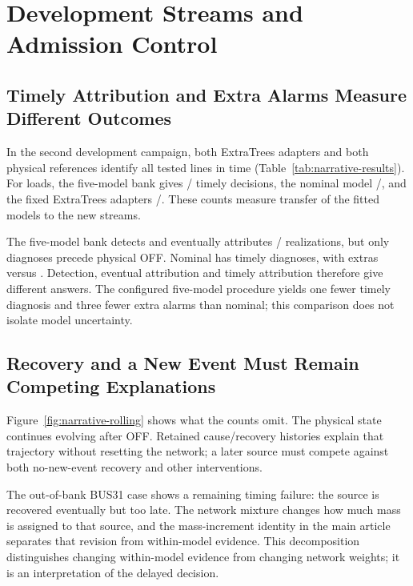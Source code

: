 \section{Development Streams and Admission Control}
\label{app:development-streams}

\subsection{Timely Attribution and Extra Alarms Measure Different Outcomes}



In the second development campaign, both ExtraTrees adapters and both physical references identify all tested lines in time (Table~\ref{tab:narrative-results}). For loads, the five-model bank gives \NarMixLoadTimely{}/\NarMixLoadTotal{} timely decisions, the nominal model \NarNomLoadTimely{}/\NarNomLoadTotal{}, and the fixed ExtraTrees adapters \NarETLoadTimely{}/\NarETLoadTotal{}. These counts measure transfer of the fitted models to the new streams.

The five-model bank detects and eventually attributes \NarMixJoint{}/\NarMixEvents{} realizations, but only \ContMixTimely{} diagnoses precede physical OFF. Nominal has \ContNomTimely{} timely diagnoses, with \ContNomExtras{} extras versus \ContMixExtras{}. Detection, eventual attribution and timely attribution therefore give different answers. The configured five-model procedure yields one fewer timely diagnosis and three fewer extra alarms than nominal; this comparison does not isolate model uncertainty.

\subsection{Recovery and a New Event Must Remain Competing Explanations}

Figure~\ref{fig:narrative-rolling} shows what the counts omit. The physical state continues evolving after OFF. Retained cause/recovery histories explain that trajectory without resetting the network; a later source must compete against both no-new-event recovery and other interventions.



The out-of-bank BUS31 case shows a remaining timing failure: the source is recovered eventually but too late. The network mixture changes how much mass is assigned to that source, and the mass-increment identity in the main article separates that revision from within-model evidence. This decomposition distinguishes changing within-model evidence from changing network weights; it is an interpretation of the delayed decision.

